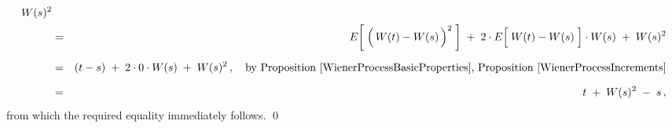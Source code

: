\begin{enumerate}
\begin{eqnarray*}
		W(s)^{2}
	\\
	& \overset{{\color{white}\textnormal{\large$1$}}}{=} &
		E\!\left[\; \left(\,W(t) \overset{{\color{white}.}}{-} W(s)\,\right)^{2} \;\right]
		\; + \;
		2 \cdot E\!\left[\; W(t) \overset{{\color{white}.}}{-} W(s) \;\right] \cdot W(s)
		\; + \;
		W(s)^{2}
	\\
	& \overset{{\color{white}\textnormal{\large$1$}}}{=} &
		(t-s)
		\; + \;
		2 \cdot 0 \cdot W(s)
		\; + \;
		W(s)^{2}\,,
		\quad
		\textnormal{by Proposition \ref{WienerProcessBasicProperties}, Proposition \ref{WienerProcessIncrements}}
	\\
	& \overset{{\color{white}\textnormal{\large$1$}}}{=} &
		t \; + \; W(s)^{2} \; - \; s\,,
	\end{eqnarray*}
	from which the required equality immediately follows.
	\qed
\end{enumerate}

